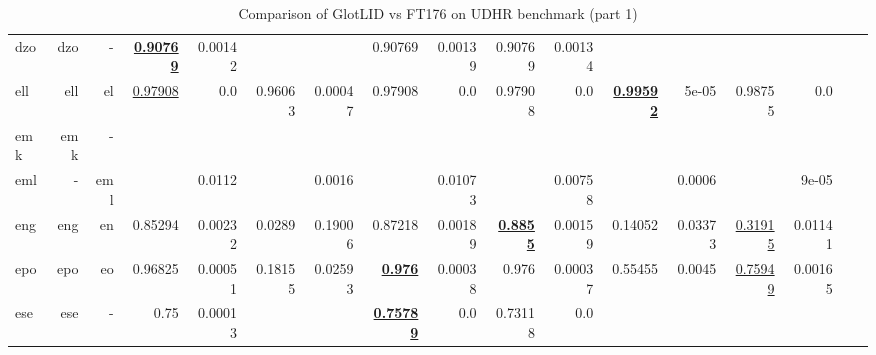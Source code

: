 \documentclass[11pt]{article}
\def\udhr{UDHR\xspace}
\def\ft176{FT176\xspace}
\begin{document}
\begin{table*}[h]
{\begin{tabular}{lrrrrrrrrrrrrrrrr}
dzo         & dzo         & -         & \textbf{\underline{0.90769}}         & 0.00142         &          &          & 0.90769         & 0.00139         & 0.90769         & 0.00134         &          &          &          &          \\
ell         & ell         & el         & \underline{0.97908}         & 0.0         & 0.96063         & 0.00047         & 0.97908         & 0.0         & 0.97908         & 0.0         & \textbf{\underline{0.99592}}         & 5e-05         & 0.98755         & 0.0         \\
emk         & emk         & -         &          &          &          &          &          &          &          &          &          &          &          &          \\
eml         & -         & eml         &          & 0.0112         &          & 0.0016         &          & 0.01073         &          & 0.00758         &          & 0.0006         &          & 9e-05         \\
eng         & eng         & en         & 0.85294         & 0.00232         & 0.0289         & 0.19006         & 0.87218         & 0.00189         & \textbf{\underline{0.8855}}         & 0.00159         & 0.14052         & 0.03373         & \underline{0.31915}         & 0.01141         \\
epo         & epo         & eo         & 0.96825         & 0.00051         & 0.18155         & 0.02593         & \textbf{\underline{0.976}}         & 0.00038         & 0.976         & 0.00037         & 0.55455         & 0.0045         & \underline{0.75949}         & 0.00165         \\
ese         & ese         & -         & 0.75         & 0.00013         &          &          & \textbf{\underline{0.75789}}         & 0.0         & 0.73118         & 0.0         &          &          &          &          \\
\end{tabular}
}
\caption{Comparison of GlotLID vs \ft176 on \udhr benchmark (part 1)}
\label{tab:appendix_glotlid_ft176_udhr_1}
\end{table*}
\end{document}
